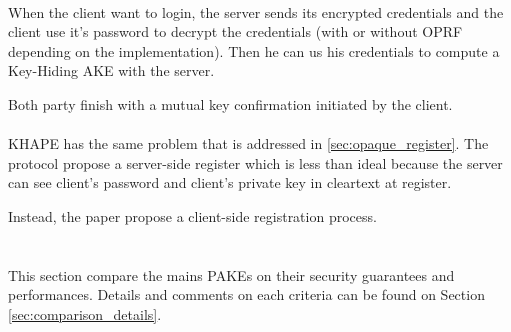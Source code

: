 \documentclass[../report.tex]{subfiles}
\begin{document}
\paragraph{}

When the client want to login, the server sends its encrypted credentials and the client use it's password to decrypt the credentials (with or without OPRF depending on the implementation). Then he can us his credentials to compute a Key-Hiding AKE with the server.

Both party finish with a mutual key confirmation initiated by the client.


\paragraph{}
KHAPE has the same problem that is addressed in \ref{sec:opaque_register}.
The protocol propose a server-side register which is less than ideal because the server can see client's password and client's private key in cleartext at register.

Instead, the paper propose a client-side registration process.






\section{}

This section compare the mains PAKEs on their security guarantees and performances. Details and comments on each criteria can be found on Section \ref{sec:comparison_details}.
\end{document}
